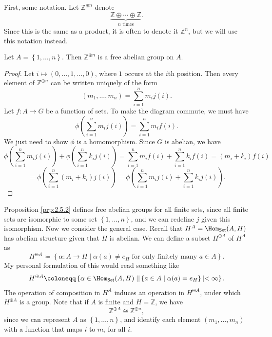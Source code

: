 First, some notation. Let $\mathbb{Z}^{\oplus n}$ denote
\[
	\underbrace{\mathbb{Z}\oplus \cdots\oplus \mathbb{Z}}_{n\text{ times}}
.\]
Since this is the same as a product, it is often to denote it $\mathbb{Z}^n$, but we will use this notation instead.
\begin{proposition}\label{prp:2.5.2}
	Let $A=\left\{ 1, \ldots, n \right\} $. Then $\mathbb{Z}^{\oplus n}$ is a free abelian group on $A$.
\end{proposition}
\begin{proof}
	Let $i\mapsto (0, \ldots, 1, \ldots, 0)$, where $1$ occurs at the $i$th position. Then every element of $\mathbb{Z}^{\oplus n}$ can be written uniquely of the form
	\[
		(m_1, \dots, m_n )=\sum_{i=1}^{n} m_i j(i)
	.\]
	Let $f : A \to G$ be a function of sets. To make the diagram commute, we must have
	\[
		\phi \left( \sum_{i=1}^{n} m_ij(i) \right) =\sum_{i=1}^{n} m_if(i)
	.\]
	We just need to show $\phi $ is a homomorphism. Since $G$ is abelian, we have
	\[
		\phi \left( \sum_{i=1}^{n} m_ij(i) \right) +\phi \left( \sum_{i=1}^{n} k_ij(i) \right) =\sum_{i=1}^{n} m_if(i)+\sum_{i=1}^{n} k_if(i)=(m_i+k_i)f(i)
	\]
	\[
		=\phi \left( \sum_{i=1}^{n} (m_i+k_i)j(i) \right) =\phi \left( \sum_{i=1}^{n} m_ij(i)+\sum_{i=1}^{n} k_ij(i) \right) 
	.\]
\end{proof}

Proposition \ref{prp:2.5.2} defines free abelian groups for all finite sets, since all finite sets are isomorphic to some set $\left\{ 1, \ldots, n \right\} $, and we can redefine $j$ given this isomorphism. Now we consider the general case. Recall that $H^A=\Hom_{\mathsf{Set}}(A , H) $ has abelian structure given that $H$ is abelian. We can define a subset $H^{\oplus A}$ of $H^A$ as
\[
	H^{\oplus A}\coloneqq \left\{ \alpha : A \to H \mid \alpha (a)\neq e_H \text{ for only finitely many }a\in A \right\} 
.\]
My personal formulation of this would read something like
\[
	H^{\oplus A}\coloneqq \left\{ \alpha \in \Hom_{\mathsf{Set}}(A , H)  \mid \right|\left\{ a\in A \mid \alpha (a)=e_H \right\}\left| < \infty \right\} 
.\]
The operation of composition in $H^A$ induces an operation in $H^{\oplus A}$, under which $H^{\oplus A}$ is a group. Note that if $A$ is finite and $H=\mathbb{Z}$, we have
\[
	\mathbb{Z}^{\oplus A}\cong \mathbb{Z}^{\oplus n}
,\]
since we can represent $A$ as $\left\{ 1, \ldots, n \right\} $, and identify each element $(m_1, \dots, m_n )$ with a function that maps $i$ to $m_i$ for all $i$.

